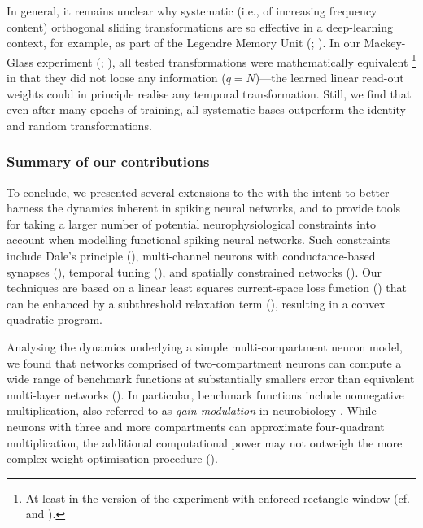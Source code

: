 In general, it remains unclear why systematic (i.e., of increasing frequency content) orthogonal sliding transformations are so effective in a deep-learning context, for example, as part of the Legendre Memory Unit (\LMU; \cite{voelker2019lmu}).
In our Mackey-Glass experiment (; ), all tested transformations were mathematically equivalent%
\footnote{At least in the version of the experiment with enforced rectangle window (cf.~ and ).}
in that they did not loose any information ($q = N$)---the learned linear read-out weights could in principle realise any temporal transformation.
Still, we find that even after many epochs of training, all systematic bases outperform the identity and random transformations.

\subsubsection{Summary of our contributions}

To conclude, we presented several extensions to the \NEF with the intent to better harness the dynamics inherent in spiking neural networks, and to provide tools for taking a larger number of potential neurophysiological constraints into account when modelling functional spiking neural networks.
Such constraints include Dale's principle (), multi-channel neurons with conductance-based synapses (), temporal tuning (), and spatially constrained networks ().
Our techniques are based on a linear least squares current-space loss function () that can be enhanced by a subthreshold relaxation term (), resulting in a convex quadratic program.

Analysing the dynamics underlying a simple multi-compartment neuron model, we found that networks comprised of two-compartment neurons can compute a wide range of benchmark functions at substantially smallers error than equivalent multi-layer networks ().
In particular, benchmark functions include nonnegative multiplication, also referred to as \emph{gain modulation} in neurobiology \citep{salinas2000gain}.
While neurons with three and more compartments can approximate four-quadrant multiplication, the additional computational power may not outweigh the more complex weight optimisation procedure ().


